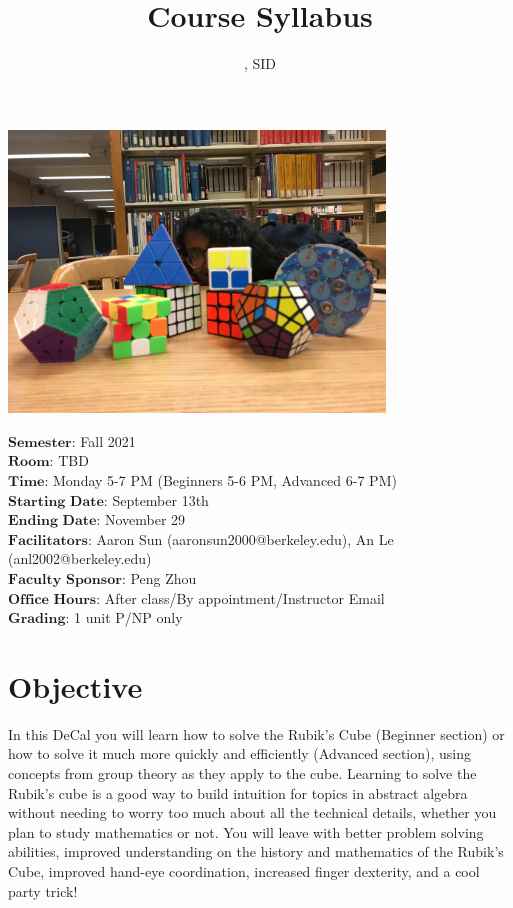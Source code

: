 \documentclass[11pt]{article}
\author{\Name, SID \SID}
\date{}
\begin{document}
\maketitle
\title{Course Syllabus}
\centerline{\includegraphics[width=10cm]{5.JPG}}

$\textbf{Semester}$: Fall 2021\\
$\textbf{Room}$: TBD\\
$\textbf{Time}$: Monday 5-7 PM (Beginners 5-6 PM, Advanced 6-7 PM)\\
$\textbf{Starting Date}$: September 13th\\
$\textbf{Ending Date}$: November 29\\
$\textbf{Facilitators}$: Aaron Sun (aaronsun2000@berkeley.edu), An Le (anl2002@berkeley.edu) \\
$\textbf{Faculty Sponsor}$: Peng Zhou\\
$\textbf{Office Hours}$: After class/By appointment/Instructor Email \\
$\textbf{Grading}$: 1 unit P/NP only

\section*{Objective}
In this DeCal you will learn how to solve the Rubik’s Cube (Beginner section) or how to solve it much more quickly and efficiently (Advanced section), using concepts from group theory as they apply to the cube. Learning to solve the Rubik's cube is a good way to build intuition for topics in abstract algebra without needing to worry too much about all the technical details, whether you plan to study mathematics or not. You will leave with better problem solving abilities, improved understanding on the history and mathematics of the Rubik’s Cube, improved hand-eye coordination, increased finger dexterity, and a cool party trick!
\end{document}
